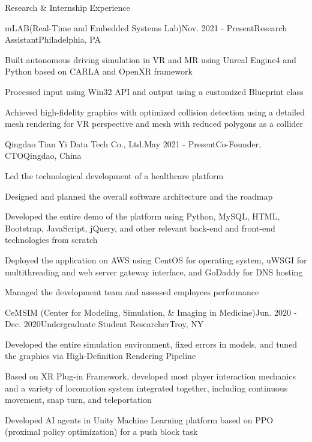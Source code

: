 \documentclass{resume} %
\begin{document}
\begin{rSection}{Research \& Internship Experience}

\begin{rSubsection}{mLAB(Real-Time and Embedded Systems Lab)}{Nov. 2021  - Present}{Research Assistant}{Philadelphia, PA}
\item Built autonomous driving simulation in VR and MR using Unreal Engine4 and Python based on CARLA and OpenXR framework
\item Processed input using Win32 API and output using a customized Blueprint class
\item Achieved high-fidelity graphics with optimized collision detection using a detailed mesh rendering for VR perspective and mesh with reduced polygons as a collider
\end{rSubsection}


\begin{rSubsection}{Qingdao Tian Yi Data Tech Co., Ltd.}{May 2021 - Present}{Co-Founder, CTO}{Qingdao, China}
\item Led the technological development of a healthcare platform
\item Designed and planned the overall software architecture and the roadmap
\item Developed the entire demo of the platform using Python, MySQL, HTML, Bootstrap, JavaScript, jQuery, and other relevant back-end and front-end technologies from scratch
\item Deployed the application on AWS using CentOS for operating system, uWSGI for multithreading and web server gateway interface, and GoDaddy for DNS hosting
\item Managed the development team and assessed employees performance
\end{rSubsection}


\begin{rSubsection}{CeMSIM (Center for Modeling, Simulation, \& Imaging in Medicine)}{Jun. 2020 - Dec. 2020}{Undergraduate Student Researcher}{Troy, NY}
\item Developed the entire simulation environment, fixed errors in models, and tuned the graphics via High-Definition Rendering Pipeline
\item Based on XR Plug-in Framework, developed most player interaction mechanics and a variety of locomotion system integrated together, including continuous movement, snap turn, and teleportation
\item Developed AI agents in Unity Machine Learning platform based on PPO (proximal policy optimization) for a push block task
\end{rSubsection}


\end{rSection}
\end{document}
